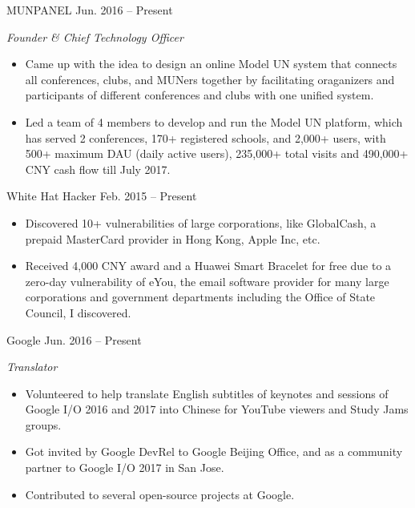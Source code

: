 \documentclass[hidelinks__VERSION__]{adamyi-cv} %
\begin{document}
\begin{entrylist}


\entry
{MUNPANEL}
{Jun. 2016 -- Present}
{\emph{Founder \& Chief Technology Officer}
\begin{itemize}
\item Came up with the idea to design an online Model UN system that connects all conferences, clubs, and MUNers together by facilitating oraganizers and participants of different conferences and clubs with one unified system.
\item Led a team of 4 members to develop and run the Model UN platform, which has served 2 conferences, 170+ registered schools, and 2,000+ users, with 500+ maximum DAU (daily active users), 235,000+ total visits and 490,000+ CNY cash flow till July 2017.
\end{itemize}}


\entry
{White Hat Hacker}
{Feb. 2015 -- Present}
{\begin{itemize}
\item Discovered 10+ vulnerabilities of large corporations, like GlobalCash, a prepaid MasterCard provider in Hong Kong, Apple Inc, etc.
\item Received 4,000 CNY award and a Huawei Smart Bracelet for free due to a zero-day vulnerability of eYou, the email software provider for many large corporations and government departments including the Office of State Council, I discovered.
\end{itemize}}


\entry
{Google}
{Jun. 2016 -- Present}
{\emph{Translator}
\begin{itemize}
\item Volunteered to help translate English subtitles of keynotes and sessions of Google I/O 2016 and 2017 into Chinese for YouTube viewers and Study Jams groups.
\item Got invited by Google DevRel to Google Beijing Office, and as a community partner to Google I/O 2017 in San Jose.
\item Contributed to several open-source projects at Google.
\end{itemize}}



\end{entrylist}
\end{document}
